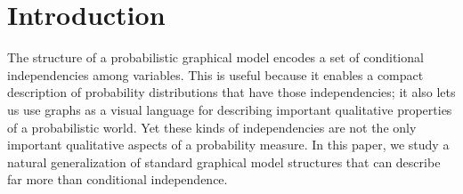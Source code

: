\section{Introduction}
The 
structure of a probabilistic graphical model
    encodes a set of conditional independencies among variables.
This is useful because it enables a compact description of
    probability distributions that have those independencies;
it also lets us use graphs as a visual language for
    describing important qualitative
    properties of a probabilistic world.
% 
Yet these kinds of independencies are not the only important
    qualitative aspects of a probability measure.
In this paper, we study a natural generalization of standard graphical model structures that can describe far more than conditional independence. 

